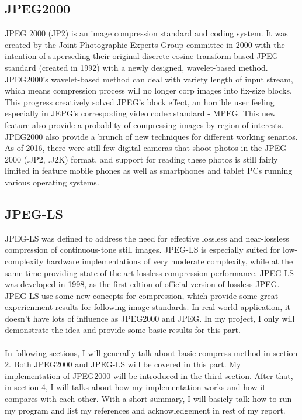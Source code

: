 \documentclass[UTF8, letterpaper, 14pt]{article}
\begin{document}
\subsection{JPEG2000}
JPEG 2000 (JP2) is an image compression standard and coding system. It was created by the Joint Photographic Experts Group committee in 2000 with the intention of superseding their original discrete cosine transform-based JPEG standard (created in 1992) with a newly designed, wavelet-based method.\cite{jpeg2kwiki} JPEG2000's wavelet-based method can deal with variety length of input stream, which means compression process will no longer corp images into fix-size blocks. This progress creatively solved JPEG's block effect, an horrible user feeling especially in JEPG's correspoding video codec standard - MPEG. This new feature also provide a probablity of compressing images by region of interests. JPEG2000 also provide a brunch of new techniques for different working senarios. As of 2016, there were still few digital cameras that shoot photos in the JPEG-2000 (.JP2, .J2K) format, and support for reading these photos is still fairly limited in feature mobile phones as well as smartphones and tablet PCs running various operating systems.\cite{jpeg2kwiki}
\subsection{JPEG-LS}
JPEG-LS was defined to address the need for effective lossless and near-lossless compression of continuous-tone still images. JPEG-LS is especially suited for low-complexity hardware implementations of very moderate complexity, while at the same time providing state-of-the-art lossless compression performance.\cite{jpegls} JPEG-LS was developed in 1998, as the first edtion of official version of lossless JPEG. JPEG-LS use some new concepts for compression, which provide some great experienment results for following image standards. In real world application, it doesn't have lots of influence as JPEG2000 and JPEG. In my project, I only will demonstrate the idea and provide some basic results for this part.\\
\\
In following sections, I will generally talk about basic compress method in section 2. Both JPEG2000 and JPEG-LS will be covered in this part. My implementation of JPEG2000 will be introduced in the third section. After that, in section 4, I will talks about how my implementation works and how it compares with each other. With a short summary, I will basicly talk how to run my program and list my references and acknowledgement in rest of my report.
\end{document}
